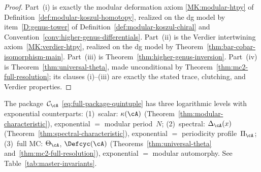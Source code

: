 \begin{proof}
Part~\textup{(i)} is exactly the modular deformation axiom
\textup{\ref{MK:modular-htpy}} of
Definition~\ref{def:modular-koszul-homotopy}, realized on the dg model
by item~\textup{\ref{D:genus-tower}} of
Definition~\ref{def:modular-koszul-chiral} and
Convention~\ref{conv:higher-genus-differentials}.  Part~\textup{(ii)} is
the Verdier intertwining axiom~\textup{\ref{MK:verdier-htpy}}, realized
on the dg model by
Theorem~\ref{thm:bar-cobar-isomorphism-main}.  Part~\textup{(iii)} is
Theorem~\ref{thm:higher-genus-inversion}.  Part~\textup{(iv)} is
Theorem~\ref{thm:universal-theta}, made unconditional by
Theorem~\ref{thm:mc2-full-resolution}; its clauses
\textup{(i)}--\textup{(iii)} are exactly the stated trace, clutching,
and Verdier properties.
\end{proof}

\begin{remark}
\label{rem:modular-characteristic-package}
\label{rem:characteristic-hierarchy}
The package~$\mathcal{C}_{\cA}$ \eqref{eq:full-package-quintuple}
has three logarithmic levels with exponential counterparts:
(1)~scalar: $\kappa(\cA)$ (Theorem~\ref{thm:modular-characteristic}),
exponential $=$ modular period~$N$;
(2)~spectral: $\Delta_{\cA}(x)$
(Theorem~\ref{thm:spectral-characteristic}),
exponential $=$ periodicity profile~$\Pi_{\cA}$;
(3)~full MC: $\Theta_{\cA}$, $\Defcyc(\cA)$
(Theorems~\ref{thm:universal-theta} and~\ref{thm:mc2-full-resolution}),
exponential $=$ modular automorphy.
See Table~\ref{tab:master-invariants}.
\end{remark}

